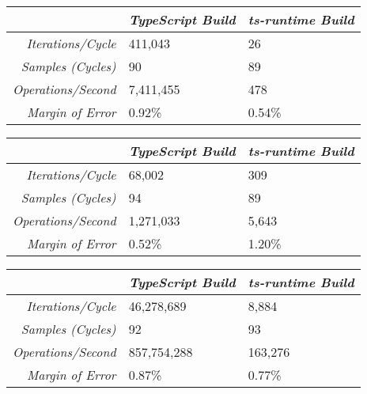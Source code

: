 \begin{center}
{
\centering
\tabulinesep=1.2mm
\setlength{\tabcolsep}{5mm}
\def\arraystretch{1.25}
\small
\begin{tabu} to \textwidth {|r||X[c,m]|X[c,m]|}
  \hline
  & \emph{TypeScript Build} & \emph{ts-runtime Build} \\
  \hline
  \hline
  \emph{Iterations/Cycle}  & 411,043 & 26 \\
  \hline
  \emph{Samples (Cycles)}  & 90 & 89 \\
  \hline
  \emph{Operations/Second} & 7,411,455 & 478 \\
  \hline
  \emph{Margin of Error}   & 0.92\% & 0.54\% \\
  \hline
\end{tabu}
}
\end{center}

\begin{center}
{
\centering
\tabulinesep=1.2mm
\setlength{\tabcolsep}{5mm}
\def\arraystretch{1.25}
\small
\begin{tabu} to \textwidth {|r||X[c,m]|X[c,m]|}
  \hline
  & \emph{TypeScript Build} & \emph{ts-runtime Build} \\
  \hline
  \hline
  \emph{Iterations/Cycle}  & 68,002 & 309 \\
  \hline
  \emph{Samples (Cycles)}  & 94 & 89 \\
  \hline
  \emph{Operations/Second} & 1,271,033 & 5,643 \\
  \hline
  \emph{Margin of Error}   & 0.52\% & 1.20\% \\
  \hline
\end{tabu}
}
\end{center}

\begin{center}
{
\centering
\tabulinesep=1.2mm
\setlength{\tabcolsep}{5mm}
\def\arraystretch{1.25}
\small
\begin{tabu} to \textwidth {|r||X[c,m]|X[c,m]|}
  \hline
  & \emph{TypeScript Build} & \emph{ts-runtime Build} \\
  \hline
  \hline
  \emph{Iterations/Cycle}  & 46,278,689 & 8,884 \\
  \hline
  \emph{Samples (Cycles)}  & 92 & 93 \\
  \hline
  \emph{Operations/Second} & 857,754,288 & 163,276 \\
  \hline
  \emph{Margin of Error}   & 0.87\% & 0.77\% \\
  \hline
\end{tabu}
}
\end{center}

